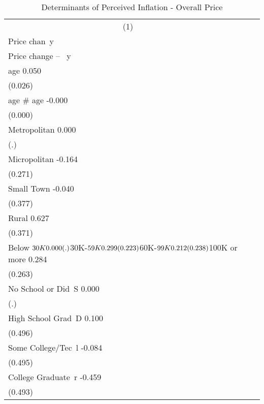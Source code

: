 \begin{table}[H]\centering
\caption{Determinants of Perceived Inflation - Overall Price \label{tab1}}
\begin{tabular}{l*{1}{c}}\toprule
                   \multicolumn{1}{c}{(1)}   \\
                   Price chan~y   \\
\midrule
Price change -- ~y                \\
age                       0.050   \\
                        (0.026)   \\
age # age                -0.000   \\
                        (0.000)   \\
Metropolitan              0.000   \\
                            (.)   \\
Micropolitan             -0.164   \\
                        (0.271)   \\
Small Town               -0.040   \\
                        (0.377)   \\
Rural                     0.627   \\
                        (0.371)   \\
Below $30K                0.000   \\
                            (.)   \\
$30K-$59K                 0.299   \\
                        (0.223)   \\
$60K-$99K                 0.212   \\
                        (0.238)   \\
$100K or more             0.284   \\
                        (0.263)   \\
No School or Did~S        0.000   \\
                            (.)   \\
High School Grad~D        0.100   \\
                        (0.496)   \\
Some College/Tec~l       -0.084   \\
                        (0.495)   \\
College Graduate~r       -0.459   \\
                        (0.493)   \\

\end{tabular}
\end{table}
